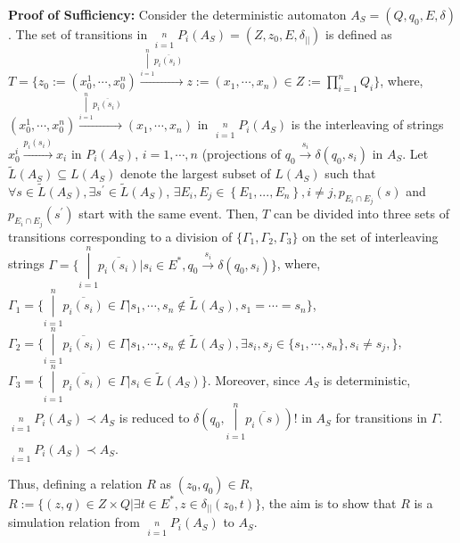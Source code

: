 \textbf{Proof of Sufficiency:}
Consider the deterministic automaton $A_S =
(Q, q_0, E, \delta)$. The set of transitions in $\mathop
{||}\limits_{i = 1}^n P_i(A_S) = (Z, z_0, E, \delta_{||})$ is
defined as $T = \{z_0:= (x_0^1,\cdots,x_0^n)\overset{\mathop
{|}\limits_{i = 1}^n \overline{p_i(s_i)}} \longrightarrow z:=
(x_1,\cdots,x_n)\in Z:=\mathop {\prod}\limits_{i = 1}^n Q_i\}$,
where, $(x_0^1,\cdots,x_0^n)\overset{\mathop {|}\limits_{i = 1}^n
\overline{p_i(s_i)}}\longrightarrow(x_1,\cdots,x_n)$ in $\mathop
{||}\limits_{i = 1}^n P_i(A_S)$ is the interleaving of strings
$x_0^i\overset{ p_i(s_i)}\longrightarrow x_i$ in $P_i(A_S)$, $i
=1,\cdots, n$ (projections of $q_0\overset{ s_i }\longrightarrow
\delta(q_0, s_i)$ in $A_S$. Let $\tilde L\left( {A_S } \right) \subseteq L\left( {A_S }
\right)$ denote the largest subset of $L\left( {A_S } \right)$ such that
$\forall s\in \tilde L\left( {A_S } \right), \exists s^{\prime} \in
 \tilde L\left( {A_S } \right)$, $\exists E_i, E_j  \in \left\{ E_1
,...,E_n  \right\},
 i \ne j, p_{E_i  \cap E_j } \left( s \right)$ and $p_{E_i  \cap E_j } \left( s^{\prime} \right)$  start with the same
 event. Then, $T$ can be divided into three sets of
transitions corresponding to a division of $\{\Gamma_1, \Gamma_2,
\Gamma_3\}$ on the set of interleaving strings $\Gamma = \{\mathop
{|}\limits_{i = 1}^n \overline{p_i(s_i)}|s_i \in E^*, q_0\overset{
s_i }\longrightarrow \delta(q_0, s_i)\}$, where, $\Gamma_1 =
\{\mathop {|}\limits_{i = 1}^n \overline{p_i(s_i)}\in \Gamma | s_1,
\cdots, s_n \notin \tilde{L}(A_S), s_1=\cdots = s_n\}$, $\Gamma_2 =
\{\mathop {|}\limits_{i = 1}^n \overline{p_i(s_i)}\in \Gamma | s_1, \cdots, s_n \notin \tilde{L}(A_S),
\exists s_i, s_j \in \{s_1, \cdots, s_n\}, s_i \neq s_j,
\}$, $\Gamma_3 =
\{\mathop {|}\limits_{i = 1}^n \overline{p_i(s_i)}\in \Gamma | s_i
\in \tilde{L}(A_S)\}$. Moreover, since $A_S$ is deterministic, $\mathop {||}\limits_{i = 1}^n P_i(A_S)\prec A_S$ is reduced to $\delta(q_0, \mathop {|}\limits_{i = 1}^n \overline{p_i(s)})!$  in $A_S$ for transitions in $\Gamma$.
$\mathop {||}\limits_{i = 1}^n P_i(A_S)\prec A_S$.



Thus, defining a relation $R$ as $(z_0, q_0)\in
R$, $R:=\{(z, q)\in Z\times Q|\exists t\in E^*, z\in
\delta_{||}(z_0, t)\}$, the aim is to show that $R$ is a simulation
relation from $\mathop {||}\limits_{i = 1}^n P_i(A_S)$ to $A_S$.

